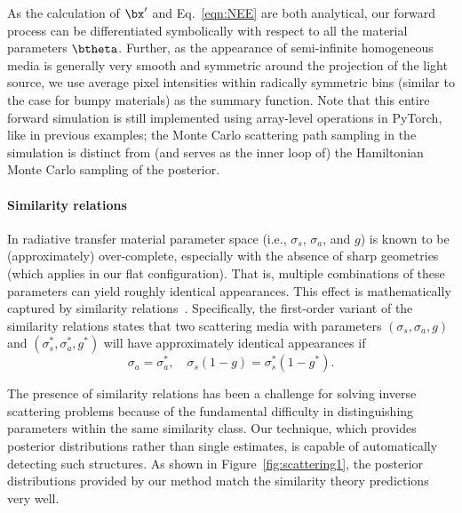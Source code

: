 
As the calculation of $\bx'$ and Eq.~\eqref{eqn:NEE} are both analytical, our forward process can be differentiated symbolically with respect to all the material parameters $\btheta$.
Further, as the appearance of semi-infinite homogeneous media is generally very smooth and symmetric around the projection of the light source, we use average pixel intensities within radically symmetric bins (similar to the case for bumpy materials) as the summary function. Note that this entire forward simulation is still implemented using array-level operations in PyTorch, like in previous examples; the Monte Carlo scattering path sampling in the simulation is distinct from (and serves as the inner loop of) the Hamiltonian Monte Carlo sampling of the posterior.

\paragraph{Similarity relations}
In radiative transfer material parameter space (i.e., $\sigma_s$, $\sigma_a$, and $g$) is known to be (approximately) over-complete, especially with the absence of sharp geometries (which applies in our flat configuration).
That is, multiple combinations of these parameters can yield roughly identical appearances.
This effect is mathematically captured by similarity relations~\cite{Zhao:2014:HSR}.
Specifically, the first-order variant of the similarity relations states that two scattering media with parameters $(\sigma_s, \sigma_a, g)$ and $(\sigma_s^*, \sigma_a^*, g^*)$ will have approximately identical appearances if
%
\begin{equation}
\sigma_a = \sigma_a^*, \quad
\sigma_s (1 - g) = \sigma_s^* (1 - g^*).
\end{equation}

The presence of similarity relations has been a challenge for solving inverse scattering problems because of the fundamental difficulty in distinguishing parameters within the same similarity class.
Our technique, which provides posterior distributions rather than single estimates, is capable of automatically detecting such structures.
As shown in Figure~\ref{fig:scattering1}, the posterior distributions provided by our method match the similarity theory predictions very well.

